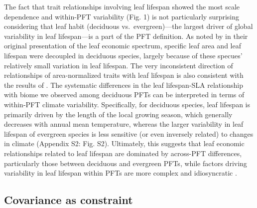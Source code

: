 \documentclass{article}
\begin{document}
The fact that trait relationships involving leaf lifespan showed the most scale dependence and within-PFT variability (Fig. 1) is not particularly surprising considering that leaf habit (deciduous vs.\ evergreen)---the largest driver of global variability in leaf lifespan---is a part of the PFT definition.
As noted by \citealt{wright_2004_worldwide} in their original presentation of the leaf economic spectrum, specific leaf area and leaf lifespan were decoupled in deciduous species, largely because of these specues' relatively small variation in leaf lifespan.
The very inconsistent direction of relationships of area-normalized traits with leaf lifespan is also consistent with the results of \citealt{wright_2004_worldwide}.
The systematic differences in the leaf lifespan-SLA relationship with biome we observed among deciduous PFTs can be interpreted in terms of within-PFT climate variability.
Specifically, for deciduous species, leaf lifespan is primarily driven by the length of the local growing season, which generally decreases with annual mean temperature, whereas the larger variability in leaf lifespan of evergreen species is less sensitive (or even inversely related) to changes in climate (Appendix S2: Fig. S2).
Ultimately, this suggests that leaf economic relationships related to leaf lifespan are dominated by across-PFT differences, particularly those between deciduous and evergreen PFTs, while factors driving variability in leaf lifespan within PFTs are more complex and idiosyncratic \citep{reich_2014_biogeographic,wu_2016_leaf}.

\subsection{Covariance as constraint}
\end{document}
